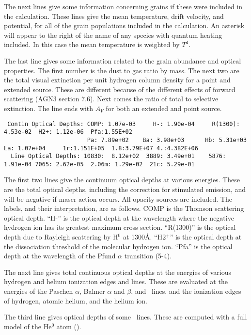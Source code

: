 The next lines give some information concerning grains if these were
included in the calculation.
These lines give the mean temperature, drift
velocity, and potential, for all of the grain populations included in the
calculation.
An asterisk will appear to the right of the name of any
species with quantum heating included.
In this case the mean temperature
is weighted by $T^4$.

The last line gives some information related to the grain abundance and
optical properties.
The first number is the dust to gas ratio by mass.
The next two are the total visual extinction per unit hydrogen column density
for a point and extended source.
These are different because of the
different effects of forward scattering (AGN3 section 7.6).
Next comes
the ratio of total to selective extinction.
The line ends with $A_V$ for both
an extended and point source.
{\setverbatimfontsize{\tiny}
\begin{verbatim}
 Contin Optical Depths: COMP: 1.07e-03     H-: 1.90e-04     R(1300): 4.53e-02  H2+: 1.12e-06  Pfa:1.55E+02
                        Pa: 7.89e+02    Ba: 3.98e+03      Hb: 5.31e+03    La: 1.07e+04     1r:1.151E+05  1.8:3.79E+07 4.:4.382E+06
  Line Optical Depths: 10830:  8.12e+02  3889: 3.49e+01    5876: 1.91e-04 7065: 2.62e-05  2.06m: 1.29e-02  21c: 5.29e-01
\end{verbatim}
}

The first two lines give the continuum optical depths at various energies.
These are the total optical depths, including the correction for stimulated
emission, and will be negative if maser action occurs. All opacity sources
are included.
The labels, and their interpretation, are as follows. COMP
is the Thomson scattering optical depth.
``H-'' is the optical depth at the
wavelength where the negative hydrogen ion has its greatest maximum cross
section.
``R(1300)'' is the optical depth due to Rayleigh scattering by
H$^0$ at 1300\AA .
``H2$^+$'' is the optical depth at the dissociation threshold
of the molecular hydrogen ion.
``Pfa'' is the optical depth at the
wavelength of the Pfund $\alpha$ transition (5-4).

The next line gives total continuous optical depths at the energies of
various hydrogen and helium ionization edges and lines. These are evaluated
at the energies of the Paschen $\alpha$, Balmer $\alpha$ and $\beta$, and
\la\ lines, and the
ionization edges of hydrogen, atomic helium, and the helium ion.

The third line gives optical depths of some \hei\ lines.  These are
computed with a full model of the He$^0$ atom (\citealp{Porter2005}).

